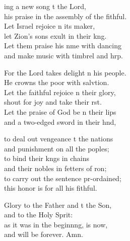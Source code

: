 \settowidth{\versewidth}{his praise in the assembly of the faithful.}
\begin{psalmverse}%
  \begin{patverse}
    ing a new song t the Lord,\Med\\
his praise in the assembly of the fithful.\\
Let Israel rejoice \pointup{\i}n its maker,\Med\\
let Zion’s sons exult in their k\pointup{\i}ng.\\
Let them praise his nme with dancing\Med\\
and make music with timbrel and hrp.

For the Lord takes delight \pointup{\i}n his people.\Med\\
He crowns the poor with salvtion.\\
Let the faithful rejoice \pointup{\i}n their glory,\Med\\
shout for joy and take their rst.\\
Let the praise of God be n their lips\Med\\
and a two-edged sword in their hnd,

to deal out vengeance t the nations\Med\\
and punishment on all the poples;\\
to bind their k\pointup{\i}ngs in chains\Med\\
and their nobles in fetters of \pointup{\i}ron;\\
to carry out the sentence pr-ordained;\Med\\
this honor is for all his fithful.

Glory to the Father and t the Son,\Med\\
and to the Holy Sp\pointup{\i}rit:\\
as it was in the beginn\pointup{\i}ng, is now,\Med\\
and will be forever. Amn.
  \end{patverse}
\end{psalmverse}
